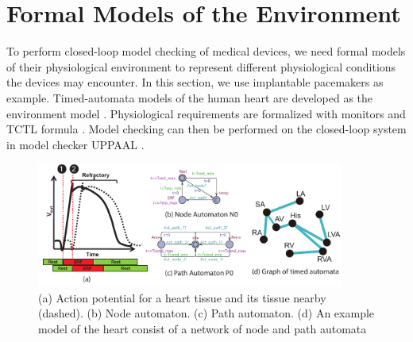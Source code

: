 \section{Formal Models of the Environment}
\label{formalModelsofEnv}
To perform closed-loop model checking of medical devices, we need formal models of their physiological environment to represent different physiological conditions the devices may encounter. In this section, we use implantable pacemakers as example. Timed-automata \cite{timed_automata} models of the human heart are developed as the environment model \cite{sttt13,VHM_proc}. Physiological requirements are formalized with monitors and TCTL formula  \cite{TCTL}. Model checking can then be performed on the closed-loop system in model checker UPPAAL \cite{uppaal}. %
\begin{figure}[!t]
	\centering
	\includegraphics[width=0.9\textwidth]{figs/init_abs.pdf}
	\caption{\small (a) Action potential for a heart tissue and its tissue nearby (dashed). (b) Node automaton. (c) Path automaton. (d) An example model of the heart consist of a network of node and path automata}
	\label{fig:nodepathTA}
\end{figure}

